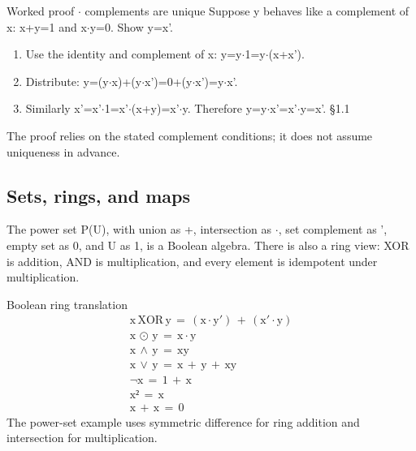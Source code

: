 \documentclass[11pt]{article}
\begin{document}
\begin{keepsection}
\begin{keepsection}
\begin{workedbox}{Worked proof \ensuremath{\cdot} complements are unique}
Suppose y behaves like a complement of x: x+y=1 and x\ensuremath{\cdot}y=0. Show y=x'.

\begin{enumerate}
\item Use the identity and complement of x: y=y\ensuremath{\cdot}1=y\ensuremath{\cdot}(x+x').
\item Distribute: y=(y\ensuremath{\cdot}x)+(y\ensuremath{\cdot}x')=0+(y\ensuremath{\cdot}x')=y\ensuremath{\cdot}x'.
\item Similarly x'=x'\ensuremath{\cdot}1=x'\ensuremath{\cdot}(x+y)=x'\ensuremath{\cdot}y. Therefore y=y\ensuremath{\cdot}x'=x'\ensuremath{\cdot}y=x'. \hfill{\small\color{FAUblue}§1.1}
\end{enumerate}

The proof relies on the stated complement conditions; it does not assume uniqueness in advance.
\end{workedbox}
\end{keepsection}

\begin{keepsection}
\subsection{Sets, rings, and maps}

The power set P(U), with union as +, intersection as \ensuremath{\cdot}, set complement as ', empty set as 0, and U as 1, is a Boolean algebra. There is also a ring view: XOR is addition, AND is multiplication, and every element is idempotent under multiplication.

\begin{equationcard}{Boolean ring translation}
\[ \begin{gathered} \mathrm{x}\, \text{XOR}\, \mathrm{y}\, =\, (\mathrm{x}\cdot \mathrm{y}')\, +\, (\mathrm{x}'\cdot \mathrm{y}) \\ \mathrm{x}\, ⊙\, \mathrm{y}\, =\, \mathrm{x}\cdot \mathrm{y} \\ \mathrm{x}\, \land \, \mathrm{y}\, =\, \text{xy} \\ \mathrm{x}\, \lor \, \mathrm{y}\, =\, \mathrm{x}\, +\, \mathrm{y}\, +\, \text{xy} \\ \neg \mathrm{x}\, =\, 1\, +\, \mathrm{x} \\ \mathrm{x}²\, =\, \mathrm{x} \\ \mathrm{x}\, +\, \mathrm{x}\, =\, 0 \end{gathered} \]
{\small The power-set example uses symmetric difference for ring addition and intersection for multiplication.}
\end{equationcard}


\end{keepsection}
\end{keepsection}
\end{document}
